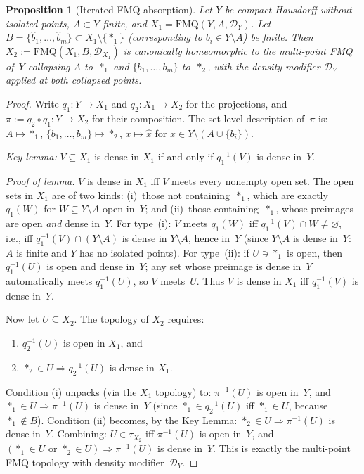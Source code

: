 \documentclass[11pt]{article}
\newtheorem{proposition}[theorem]{Proposition}
\theoremstyle{definition}
\theoremstyle{remark}
\begin{document}
\begin{proposition}[Iterated FMQ absorption]\label{prop:absorption}
Let $Y$ be compact Hausdorff without isolated points,
$A \subset Y$ finite, and
$X_1 = \mathrm{FMQ}(Y, A, \mathcal{D}_Y)$.
Let $B = \{\hat{b}_1, \ldots, \hat{b}_m\} \subset
X_1 \setminus \{\ast_1\}$ \textup{(}corresponding to
$b_i \in Y \setminus A$\textup{)} be finite.
Then $X_2 := \mathrm{FMQ}(X_1, B, \mathcal{D}_{X_1})$ is
canonically homeomorphic to the multi-point FMQ of~$Y$
collapsing $A$ to~$\ast_1$ and $\{b_1, \ldots, b_m\}$
to~$\ast_2$, with the density modifier $\mathcal{D}_Y$ applied
at both collapsed points.
\end{proposition}

\begin{proof}
Write $q_1\colon Y \to X_1$ and $q_2\colon X_1 \to X_2$ for
the projections, and $\pi := q_2 \circ q_1\colon Y \to X_2$
for their composition.
The set-level description of~$\pi$ is:
$A \mapsto \ast_1$, $\{b_1, \ldots, b_m\} \mapsto \ast_2$,
$x \mapsto \hat{x}$ for $x \in Y \setminus (A \cup \{b_i\})$.

\emph{Key lemma:} $V \subseteq X_1$ is dense in $X_1$ if
and only if $q_1^{-1}(V)$ is dense in~$Y$.

\emph{Proof of lemma.}\;
$V$ is dense in $X_1$ iff $V$ meets every nonempty open set.
The open sets in $X_1$ are of two kinds:
(i)~those not containing~$\ast_1$, which are exactly
$q_1(W)$ for $W \subseteq Y \setminus A$ open in~$Y$; and
(ii)~those containing~$\ast_1$, whose preimages are open \emph{and}
dense in~$Y$.
For type~(i): $V$ meets $q_1(W)$ iff
$q_1^{-1}(V) \cap W \neq \varnothing$, i.e., iff
$q_1^{-1}(V) \cap (Y \setminus A)$ is dense in
$Y \setminus A$, hence in~$Y$ (since $Y \setminus A$ is dense
in~$Y$: $A$ is finite and $Y$ has no isolated points).
For type~(ii): if $U \ni \ast_1$ is open, then $q_1^{-1}(U)$
is open and dense in~$Y$; any set whose preimage is dense in~$Y$
automatically meets $q_1^{-1}(U)$, so $V$ meets~$U$.
Thus $V$ is dense in $X_1$ iff $q_1^{-1}(V)$ is dense in~$Y$.

Now let $U \subseteq X_2$.
The topology of $X_2$ requires:
\begin{enumerate}[label=(\roman*),nosep]
\item $q_2^{-1}(U)$ is open in $X_1$, and
\item $\ast_2 \in U \Rightarrow q_2^{-1}(U)$ is dense in $X_1$.
\end{enumerate}
Condition (i) unpacks (via the $X_1$ topology) to:
$\pi^{-1}(U)$ is open in~$Y$, and
$\ast_1 \in U \Rightarrow \pi^{-1}(U)$ is dense in~$Y$
(since $\ast_1 \in q_2^{-1}(U)$ iff $\ast_1 \in U$,
because $\ast_1 \notin B$).
Condition (ii) becomes, by the Key Lemma:
$\ast_2 \in U \Rightarrow \pi^{-1}(U)$ is dense in~$Y$.
Combining: $U \in \tau_{X_2}$ iff $\pi^{-1}(U)$ is open in~$Y$,
and $(\ast_1 \in U \text{ or } \ast_2 \in U) \Rightarrow
\pi^{-1}(U)$ is dense in~$Y$.
This is exactly the multi-point FMQ topology with density
modifier~$\mathcal{D}_Y$.
\end{proof}
\end{document}
